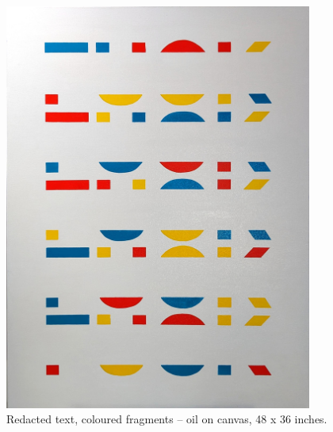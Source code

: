 \documentclass[12pt]{article}
\begin{document}
\begin{figure}[htbp]
  \centering
  \includegraphics*[width=0.9\textwidth]{figures/colour.jpg}
  \caption{Redacted text, coloured fragments -- oil on canvas, 48 x 36 inches.}
  \label{fig:colour}
\end{figure}
\end{document}
